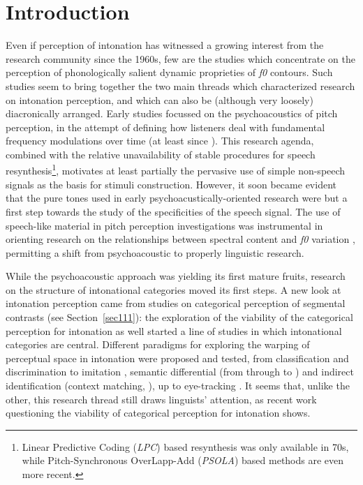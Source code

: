 \section{Introduction}\label{sec31}
Even if perception of intonation has witnessed a growing interest from the research community since the 1960s, few are the studies which concentrate on the perception of phonologically salient dynamic proprieties of \textit{f0} contours. Such studies seem to bring together the two main threads which characterized research on intonation perception, and which can also be (although very loosely) diacronically arranged. Early studies focussed on the psychoacoustics of pitch perception, in the attempt of defining how listeners deal with fundamental frequency modulations over time (at least since \citealt{sergeant1962sensitivity}). This research agenda, combined with the relative unavailability of stable procedures for speech resynthesis\footnote{Linear Predictive Coding (\textit{LPC}) based resynthesis was only available in 70s, while Pitch-Synchronous OverLapp-Add (\textit{PSOLA}) based methods are even more recent.}, motivates at least partially the pervasive use of simple non-speech signals as the basis for stimuli construction. However, it soon became evident that the pure tones used in early psychoacustically-oriented research were but a first step towards the study of the specificities of the speech signal. The use of speech-like material in pitch perception investigations \citep{rossi1971seuil,klatt1973discrimination,thart1976psychoacoustic,schouten1985identification} was instrumental in orienting research on the relationships between spectral content and \textit{f0} variation \citep{house1990tonal,house1997perceptual}, permitting a shift from psychoacoustic to properly linguistic research.

While the psychoacoustic approach was yielding its first mature fruits, research on the structure of intonational categories moved its first steps. A new look at intonation perception came from studies on categorical perception of segmental contrasts (see Section~\ref{sec111}): the exploration of the viability of the categorical perception \citep{kohler1987categorical} for intonation as well started a line of studies in which intonational categories are central. Different paradigms for exploring the warping of perceptual space in intonation were proposed and tested, from classification and discrimination to imitation \citep{pierrehumbert1989categories}, semantic differential (from  \citealt{osgood1957measurement} through \citealt{uldall1964dimensions} to \citealt{kirsner1994interaction}) and indirect identification (context matching, \citealt{nash1980intonation}), up to eye-tracking \citep{dahan2002accent}. It seems that, unlike the other, this research thread still draws linguists' attention, as recent work questioning the viability of categorical perception for intonation \citep{gussenhoven2006experimental,niebuhr2007categorical} shows.

